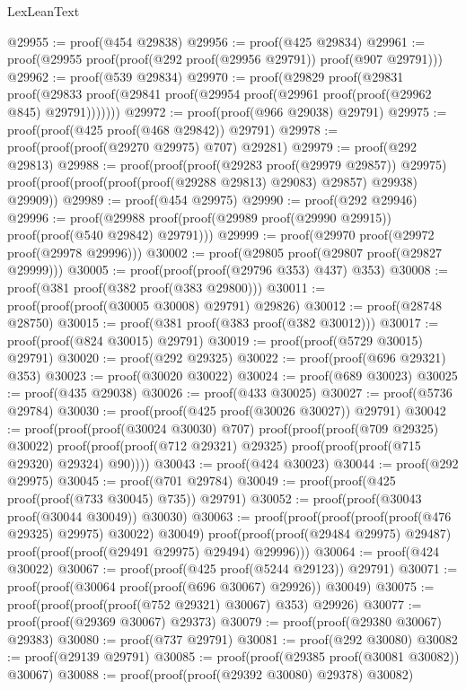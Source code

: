 \begin{lexlean}{LexLeanText}
\begin{coremodule}
@29955 := proof(@454 @29838)
@29956 := proof(@425 @29834)
@29961 := proof(@29955 proof(proof(@292 proof(@29956 @29791)) proof(@907 @29791)))
@29962 := proof(@539 @29834)
@29970 := proof(@29829
      proof(@29831
          proof(@29833 proof(@29841 proof(@29954 proof(@29961 proof(proof(@29962 @845) @29791)))))))
@29972 := proof(proof(@966 @29038) @29791)
@29975 := proof(proof(@425 proof(@468 @29842)) @29791)
@29978 := proof(proof(proof(@29270 @29975) @707) @29281)
@29979 := proof(@292 @29813)
@29988 := proof(proof(proof(@29283 proof(@29979 @29857)) @29975)
      proof(proof(proof(proof(proof(@29288 @29813) @29083) @29857) @29938) @29909))
@29989 := proof(@454 @29975)
@29990 := proof(@292 @29946)
@29996 := proof(@29988 proof(proof(@29989 proof(@29990 @29915)) proof(proof(@540 @29842) @29791)))
@29999 := proof(@29970 proof(@29972 proof(@29978 @29996)))
@30002 := proof(@29805 proof(@29807 proof(@29827 @29999)))
@30005 := proof(proof(proof(@29796 @353) @437) @353)
@30008 := proof(@381 proof(@382 proof(@383 @29800)))
@30011 := proof(proof(proof(@30005 @30008) @29791) @29826)
@30012 := proof(@28748 @28750)
@30015 := proof(@381 proof(@383 proof(@382 @30012)))
@30017 := proof(proof(@824 @30015) @29791)
@30019 := proof(proof(@5729 @30015) @29791)
@30020 := proof(@292 @29325)
@30022 := proof(proof(@696 @29321) @353)
@30023 := proof(@30020 @30022)
@30024 := proof(@689 @30023)
@30025 := proof(@435 @29038)
@30026 := proof(@433 @30025)
@30027 := proof(@5736 @29784)
@30030 := proof(proof(@425 proof(@30026 @30027)) @29791)
@30042 := proof(proof(proof(@30024 @30030) @707)
      proof(proof(proof(@709 @29325) @30022)
          proof(proof(proof(@712 @29321) @29325) proof(proof(proof(@715 @29320) @29324) @90))))
@30043 := proof(@424 @30023)
@30044 := proof(@292 @29975)
@30045 := proof(@701 @29784)
@30049 := proof(proof(@425 proof(proof(@733 @30045) @735)) @29791)
@30052 := proof(proof(@30043 proof(@30044 @30049)) @30030)
@30063 := proof(proof(proof(proof(proof(@476 @29325) @29975) @30022) @30049)
      proof(proof(proof(@29484 @29975) @29487) proof(proof(proof(@29491 @29975) @29494) @29996)))
@30064 := proof(@424 @30022)
@30067 := proof(proof(@425 proof(@5244 @29123)) @29791)
@30071 := proof(proof(@30064 proof(proof(@696 @30067) @29926)) @30049)
@30075 := proof(proof(proof(proof(@752 @29321) @30067) @353) @29926)
@30077 := proof(proof(@29369 @30067) @29373)
@30079 := proof(proof(@29380 @30067) @29383)
@30080 := proof(@737 @29791)
@30081 := proof(@292 @30080)
@30082 := proof(@29139 @29791)
@30085 := proof(proof(@29385 proof(@30081 @30082)) @30067)
@30088 := proof(proof(proof(@29392 @30080) @29378) @30082)

\end{coremodule}
\end{lexlean}

